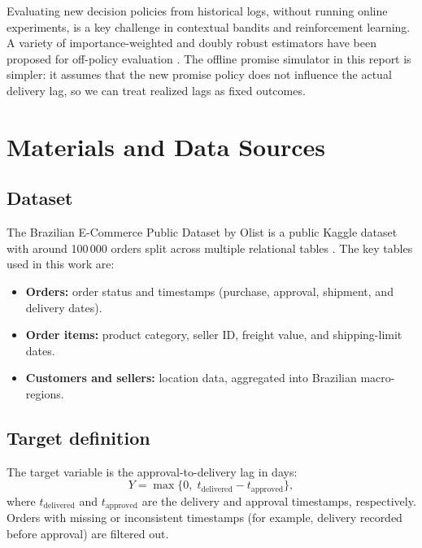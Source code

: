 \documentclass[10pt,twocolumn]{article}
\begin{document}
Evaluating new decision policies from historical logs, without running online experiments, is a key challenge in contextual bandits and reinforcement learning. A variety of importance-weighted and doubly robust estimators have been proposed for off-policy evaluation \citep{dudik2011doubly,jiang2016doubly}. The offline promise simulator in this report is simpler: it assumes that the new promise policy does not influence the actual delivery lag, so we can treat realized lags as fixed outcomes.

\section{Materials and Data Sources}
\subsection{Dataset}
The Brazilian E-Commerce Public Dataset by Olist is a public Kaggle dataset with around 100\,000 orders split across multiple relational tables \citep{olistdataset}. The key tables used in this work are:
\begin{itemize}
  \item \textbf{Orders:} order status and timestamps (purchase, approval, shipment, and delivery dates).
  \item \textbf{Order items:} product category, seller ID, freight value, and shipping-limit dates.
  \item \textbf{Customers and sellers:} location data, aggregated into Brazilian macro-regions.
\end{itemize}

\subsection{Target definition}
The target variable is the approval-to-delivery lag in days:
\begin{equation}
  Y = \max\bigl\{0,\; t_{\text{delivered}} - t_{\text{approved}}\bigr\},
\end{equation}
where $t_{\text{delivered}}$ and $t_{\text{approved}}$ are the delivery and approval timestamps, respectively. Orders with missing or inconsistent timestamps (for example, delivery recorded before approval) are filtered out.
\end{document}
